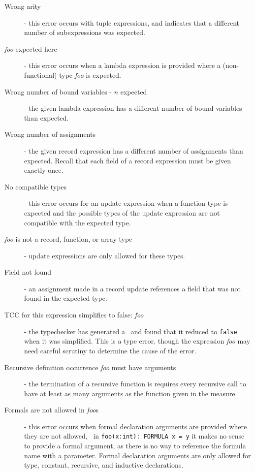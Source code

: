 \begin{description}

\item[Wrong arity] - this error occurs with tuple expressions, and
indicates that a different number of subexpressions was expected.

\item[{\em foo\/} expected here] - this error occurs when a lambda
expression is provided where a (non-functional) type \emph{foo} is
expected.

\item[Wrong number of bound variables - $n$ expected] - the given lambda
expression has a different number of bound variables than expected.

\item[Wrong number of assignments] - the given record expression has a
different number of assignments than expected.  Recall that each field of
a record expression must be given exactly once.

\item[No compatible types] - this error occurs for an update expression
when a function type is expected and the possible types of the update
expression are not compatible with the expected type.

\item[{\em foo\/} is not a record, function, or array type] - update
expressions are only allowed for these types.

\item[Field not found] - an assignment made in a record update references
a field that was not found in the expected type.

\item[TCC for this expression simplifies to false: \emph{foo}] - the
typechecker has generated a \tcc\ and found that it reduced to
\texttt{false} when it was simplified.  This is a type error, though the
expression \emph{foo} may need careful scrutiny to determine the cause of
the error.

\item[Recursive definition occurrence {\em foo\/} must have arguments] -
the termination of a recursive function is requires every recursive call
to have at least as many arguments as the function given in the measure.

\item[Formals are not allowed in {\em foo\/}s] - this error occurs when
formal declaration arguments are provided where they are not allowed, \eg\
in \texttt{foo(x:int): FORMULA x = y} it makes no sense to provide a
formal argument, as there is no way to reference the formula name with a
parameter.  Formal declaration arguments are only allowed for type,
constant, recursive, and inductive declarations.


\end{description}
